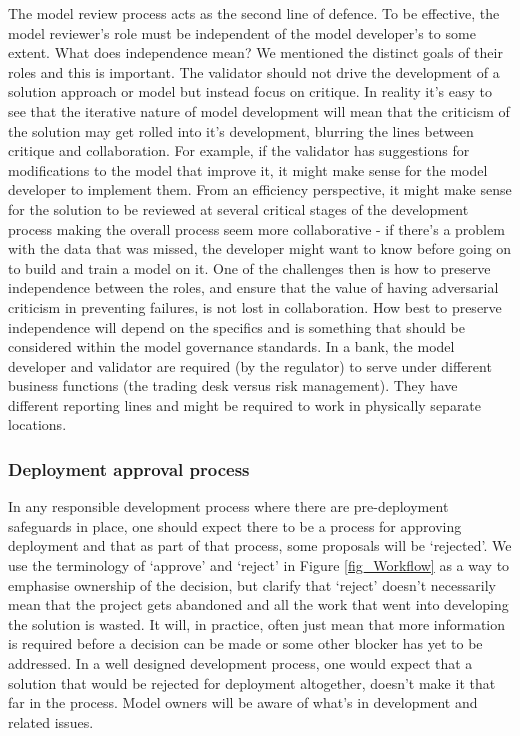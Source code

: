 The model review process acts as the second line of defence. To be effective, the model reviewer's role must be independent of the model developer's to some extent. What does independence mean? We mentioned the distinct goals of their roles and this is important. The validator should not drive the development of a solution approach or model but instead focus on critique. In reality it's easy to see that the iterative nature of model development will mean that the criticism of the solution may get rolled into it's development, blurring the lines between critique and collaboration. For example, if the validator has suggestions for modifications to the model that improve it, it might make sense for the model developer to implement them. From an efficiency perspective, it might make sense for the solution to be reviewed at several critical stages of the development process making the overall process seem more collaborative - if there's a problem with the data that was missed, the developer might want to know before going on to build and train a model on it. One of the challenges then is how to preserve independence between the roles, and ensure that the value of having adversarial criticism in preventing failures, is not lost in collaboration. How best to preserve independence will depend on the specifics and is something that should be considered within the model governance standards. In a bank, the model developer and validator are required (by the regulator) to serve under different business functions (the trading desk versus risk management). They have different reporting lines and might be required to work in physically separate locations.

\subsubsection*{Deployment approval process}

In any responsible development process where there are pre-deployment safeguards in place, one should expect there to be a process for approving deployment and that as part of that process, some proposals will be `rejected'. We use the terminology of `approve' and `reject' in Figure \ref{fig_Workflow} as a way to emphasise ownership of the decision, but clarify that `reject' doesn't necessarily mean that the project gets abandoned and all the work that went into developing the solution is wasted. It will, in practice, often just mean that more information is required before a decision can be made or some other blocker has yet to be addressed. In a well designed development process, one would expect that a solution that would be rejected for deployment altogether, doesn't make it that far in the process. Model owners will be aware of what's in development and related issues.

